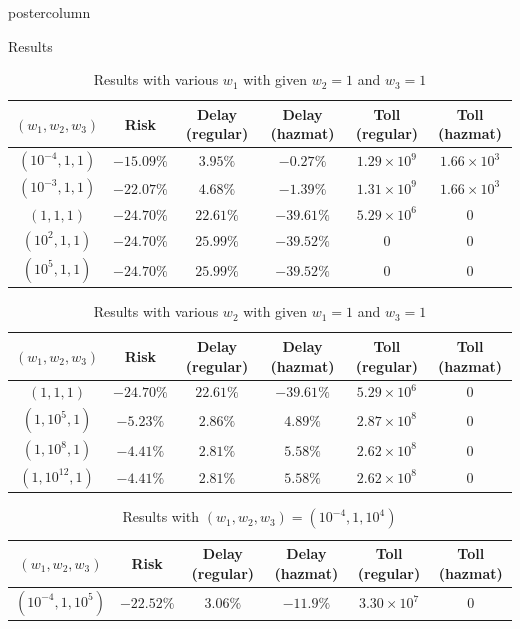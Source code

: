 \documentclass[final]{beamer}
\begin{document}
\begin{frame}
\begin{columns}
\begin{column}{0.32\textwidth}
\begin{beamercolorbox}[center,wd=\textwidth]{postercolumn}
\begin{minipage}[T]{.95\textwidth}
{  \begin{block}{Results}
    \begin{table} \centering \footnotesize
    \begin{tabular}{|c|c|c|c|c|c|}
    \hline
    $(w_1,w_2,w_3)$ & Risk & Delay (regular) & Delay (hazmat) & Toll (regular) & Toll (hazmat)\\ \hline
    $(10^{-4},1,1)$ & $-15.09 \%$ & $3.95 \% $ & $-0.27\% $ & $1.29 \times 10^9 $ & $1.66 \times 10^3$\\
    \hline
    $(10^{-3},1,1)$ & $-22.07 \%$ & $4.68 \% $ & $-1.39\% $ & $1.31 \times 10^9$ & $1.66 \times 10^3$\\
    \hline
    $(1,1,1)$ & $-24.70\%$ & $22.61\% $ & $-39.61\% $ & $5.29 \times 10^6$ & $0$\\ \hline
    $(10^2,1,1)$ & $-24.70 \%$ & $25.99 \% $ & $-39.52\% $ &$0$  & $0$\\
    \hline $(10^5,1,1)$ & $-24.70 \%$ & $25.99 \% $ & $-39.52\% $ & $0$
    & $0$
    \\
    \hline
    \end{tabular}
    \caption{Results with various $w_1$ with given $w_2 = 1$ and $w_3 =1$}
    \label{tbl:result1} 
    \end{table}
    
    \begin{table} \centering
    \footnotesize
    \begin{tabular}{|c|c|c|c|c|c|}
    \hline
    $(w_1,w_2,w_3)$ & Risk & Delay (regular) & Delay (hazmat) & Toll (regular) & Toll (hazmat)\\ \hline
    $(1,1,1)$ & $-24.70\%$ & $22.61\% $ & $-39.61\% $ & $5.29 \times 10^6$ & $0$\\ \hline
    $(1,10^5,1)$ & $-5.23\%$ & $2.86 \% $ & $4.89\% $ & $2.87 \times 10^8$ & $0$\\
    \hline
    $(1,10^8,1)$ & $-4.41 \%$ & $2.81 \% $ & $5.58\% $ & $2.62 \times 10^8$ & $0$\\
    \hline
    $(1,10^{12},1)$ & $-4.41 \%$ & $2.81 \% $ & $5.58\% $ & $2.62 \times 10^8$ & $0$\\
    \hline
    \end{tabular}
    \caption{Results with various $w_2$ with given $w_1 = 1$ and $w_3 =1$} 
    \label{tbl:result2} 
    \end{table}
    
    \begin{table} \centering
    \footnotesize
    \begin{tabular}{|c|c|c|c|c|c|}
    \hline
    $(w_1,w_2,w_3)$ & Risk & Delay (regular) & Delay (hazmat) & Toll (regular) & Toll (hazmat)\\ \hline
    $(10^{-4},1,10^5)$ & $-22.52 \%$ & $3.06 \% $ & $-11.9\% $ & $3.30 \times 10^7$ & 0\\
    \hline
    \end{tabular}
    \caption{Results with $(w_1, w_2,w_3)=(10^{-4}, 1 , 10^4)$}
    \label{tbl:result3}
    \end{table}
  

\end{block}}
\end{minipage}
\end{beamercolorbox}
\end{column}
\end{columns}
\end{frame}
\end{document}
